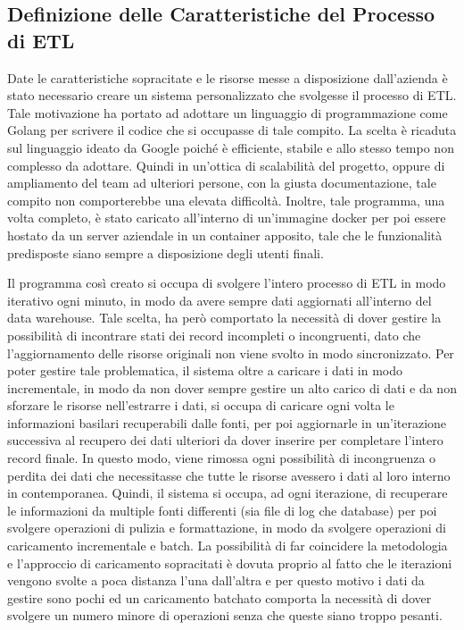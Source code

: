 \subsection{Definizione delle Caratteristiche del Processo di ETL}

Date le caratteristiche sopracitate e le risorse messe a disposizione dall'azienda è stato necessario creare un sistema personalizzato che svolgesse il processo di ETL. Tale motivazione ha portato ad adottare un linguaggio di programmazione come Golang per scrivere il codice che si occupasse di tale compito. La scelta è ricaduta sul linguaggio ideato da Google poiché è efficiente, stabile e allo stesso tempo non complesso da adottare. Quindi in un'ottica di scalabilità del progetto, oppure di ampliamento del team ad ulteriori persone, con la giusta documentazione, tale compito non comporterebbe una elevata difficoltà. Inoltre, tale programma, una volta completo, è stato caricato all'interno di un'immagine docker per poi essere hostato da un server aziendale in un container apposito, tale che le funzionalità predisposte siano sempre a disposizione degli utenti finali.

Il programma così creato si occupa di svolgere l'intero processo di ETL in modo iterativo ogni minuto, in modo da avere sempre dati aggiornati all'interno del data warehouse. Tale scelta, ha però comportato la necessità di dover gestire la possibilità di incontrare stati dei record incompleti o incongruenti, dato che l'aggiornamento delle risorse originali non viene svolto in modo sincronizzato. Per poter gestire tale problematica, il sistema oltre a caricare i dati in modo incrementale, in modo da non dover sempre gestire un alto carico di dati e da non sforzare le risorse nell'estrarre i dati, si occupa di caricare ogni volta le informazioni basilari recuperabili dalle fonti, per poi aggiornarle in un'iterazione successiva al recupero dei dati ulteriori da dover inserire per completare l'intero record finale. In questo modo, viene rimossa ogni possibilità di incongruenza o perdita dei dati che necessitasse che tutte le risorse avessero i dati al loro interno in contemporanea. Quindi, il sistema si occupa, ad ogni iterazione, di recuperare le informazioni da multiple fonti differenti (sia file di log che database) per poi svolgere operazioni di pulizia e formattazione, in modo da svolgere operazioni di caricamento incrementale e batch. La possibilità di far coincidere la metodologia e l'approccio di caricamento sopracitati è dovuta proprio al fatto che le iterazioni vengono svolte a poca distanza l'una dall'altra e per questo motivo i dati da gestire sono pochi ed un caricamento batchato comporta la necessità di dover svolgere un numero minore di operazioni senza che queste siano troppo pesanti.

